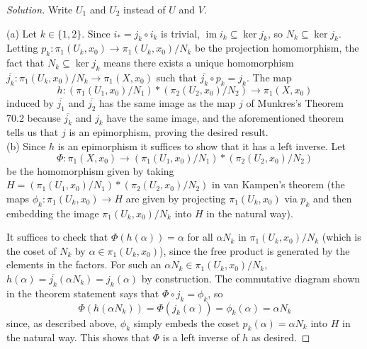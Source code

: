 \documentclass[10pt]{article}
\providecommand{\ol}{\overline}
\newenvironment{soln}{\begin{proof}[Solution]}{\end{proof}}
\begin{document}
\begin{soln}
    Write $U_1$ and $U_2$ instead of $U$ and $V$.

    (a) Let $k\in\{1,2\}$. Since $i_* = j_k\circ i_k$ is trivial,
    $\operatorname{im}i_k\subseteq\ker j_k$, so $N_k\subseteq\ker j_k$.
    Letting $p_k\colon\pi_1(U_k,x_0)\to\pi_1(U_k,x_0)/N_k$
    be the projection homomorphism, the fact that $N_k\subseteq\ker j_k$ means
    there exists a unique homomorphism
    $\ol{j_k}\colon\pi_1(U_k,x_0)/N_k\to\pi_1(X,x_0)$
    such that $\ol{j_k}\circ p_k = j_k$.
    The map
    \begin{equation*}
	h\colon(\pi_1(U_1,x_0)/N_1)*(\pi_2(U_2,x_0)/N_2)\to \pi_1(X,x_0)
    \end{equation*}
    induced by $\ol{j_1}$ and $\ol{j_2}$ has the same image
    as the map $j$ of Munkres's Theorem 70.2
    because $\ol{j_k}$ and $j_k$ have the same image,
    and the aforementioned theorem tells us
    that $j$ is an epimorphism, proving the desired result.
    \\

    (b) Since $h$ is an epimorphism it suffices to show that
    it has a left inverse. Let
    \begin{equation*}
        \Phi\colon\pi_1(X,x_0)\to(\pi_1(U_1,x_0)/N_1)*(\pi_2(U_2,x_0)/N_2)
    \end{equation*}
    be the homomorphism given by taking
    $H = (\pi_1(U_1,x_0)/N_1)*(\pi_2(U_2,x_0)/N_2)$ in van Kampen's theorem
    (the maps $\phi_k\colon\pi_1(U_k,x_0)\to H$ are
    given by projecting $\pi_1(U_k,x_0)$ via $p_k$ and then
    embedding the image $\pi_1(U_k,x_0)/N_k$ into $H$ in the natural way).

    It suffices to check that $\Phi(h(\alpha)) = \alpha$
    for all $\alpha N_k$ in $\pi_1(U_k,x_0)/N_k$
    (which is the coset of $N_k$ by $\alpha\in\pi_1(U_k,x_0)$),
    since the free product is generated by the elements in the factors.
    For such an $\alpha N_k\in\pi_1(U_k,x_0)/N_k$,
    $h(\alpha) = \ol{j_k}(\alpha N_k) = j_k(\alpha)$ by construction.
    The commutative diagram shown in the theorem statement
    says that $\Phi\circ j_k = \phi_k$, so
    \begin{equation*}
        \Phi(h(\alpha N_k)) = \Phi(j_k(\alpha)) = \phi_k(\alpha) = \alpha N_k
    \end{equation*}
    since, as described above, $\phi_k$ simply embeds the coset
    $p_k(\alpha) = \alpha N_k$ into $H$ in the natural way.
    This shows that $\Phi$ is a left inverse of $h$ as desired.
\end{soln}
\end{document}

